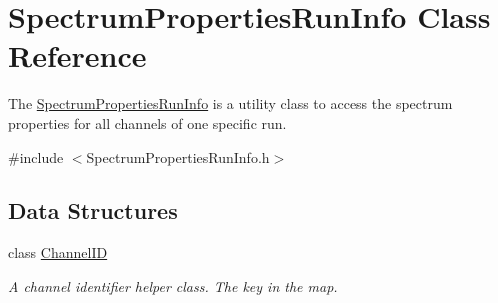 \hypertarget{class_spectrum_properties_run_info}{
\section{SpectrumPropertiesRunInfo Class Reference}
\label{class_spectrum_properties_run_info}
}


The \hyperlink{class_spectrum_properties_run_info}{SpectrumPropertiesRunInfo} is a utility class to access the spectrum properties for all channels of one specific run.  


{\ttfamily \#include $<$SpectrumPropertiesRunInfo.h$>$}\subsection*{Data Structures}
\begin{DoxyCompactItemize}
\item 
class \hyperlink{class_spectrum_properties_run_info_1_1_channel_i_d}{ChannelID}
\begin{DoxyCompactList}\small\item\em A channel identifier helper class. The key in the map. \item\end{DoxyCompactList}\end{DoxyCompactItemize}
